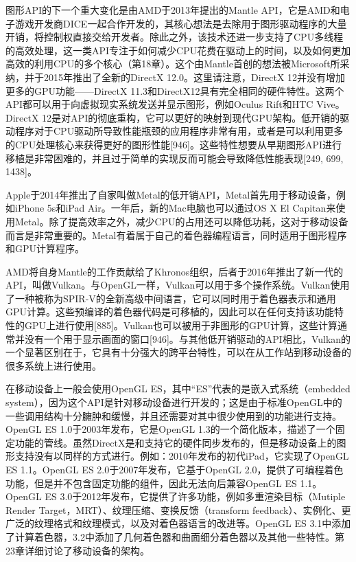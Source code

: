 \documentclass[
  paper=a4,
  ,captions=tableheading
]{scrartcl}
\begin{document}
图形API的下一个重大变化是由AMD于2013年提出的Mantle
API，它是AMD和电子游戏开发商DICE一起合作开发的，其核心想法是去除用于图形驱动程序的大量开销，将控制权直接交给开发者。除此之外，该技术还进一步支持了CPU多线程的高效处理，这一类API专注于如何减少CPU花费在驱动上的时间，以及如何更加高效的利用CPU的多个核心（第18章）。这个由Mantle首创的想法被Microsoft所采纳，并于2015年推出了全新的DirectX
12.0。这里请注意，DirectX 12并没有增加更多的GPU功能------DirectX
11.3和DirectX12具有完全相同的硬件特性。这两个API都可以用于向虚拟现实系统发送并显示图形，例如Oculus
Rift和HTC Vive。DirectX
12是对API的彻底重构，它可以更好的映射到现代GPU架构。低开销的驱动程序对于CPU驱动所导致性能瓶颈的应用程序非常有用，或者是可以利用更多的CPU处理核心来获得更好的图形性能{[}946{]}。这些特性想要从早期图形API进行移植是非常困难的，并且过于简单的实现反而可能会导致降低性能表现{[}249,
699, 1438{]}。

Apple于2014年推出了自家叫做Metal的低开销API，Metal首先用于移动设备，例如iPhone
5s和iPad Air。一年后，新的Mac电脑也可以通过OS X El
Capitan来使用Metal。除了提高效率之外，减少CPU的占用还可以降低功耗，这对于移动设备而言是非常重要的。Metal有着属于自己的着色器编程语言，同时适用于图形程序和GPU计算程序。

AMD将自身Mantle的工作贡献给了Khronos组织，后者于2016年推出了新一代的API，叫做Vulkan。与OpenGL一样，Vulkan可以用于多个操作系统。Vulkan使用了一种被称为SPIR-V的全新高级中间语言，它可以同时用于着色器表示和通用GPU计算。这些预编译的着色器代码是可移植的，因此可以在任何支持该功能特性的GPU上进行使用{[}885{]}。Vulkan也可以被用于非图形的GPU计算，这些计算通常并没有一个用于显示画面的窗口{[}946{]}。与其他低开销驱动的API相比，Vulkan的一个显著区别在于，它具有十分强大的跨平台特性，可以在从工作站到移动设备的很多系统上进行使用。

在移动设备上一般会使用OpenGL ES，其中``ES''代表的是嵌入式系统（embedded
system），因为这个API是针对移动设备进行开发的；这是由于标准OpenGL中的一些调用结构十分臃肿和缓慢，并且还需要对其中很少使用到的功能进行支持。OpenGL
ES 1.0于2003年发布，它是OpenGL
1.3的一个简化版本，描述了一个固定功能的管线。虽然DirectX是和支持它的硬件同步发布的，但是移动设备上的图形支持没有以同样的方式进行。例如：2010年发布的初代iPad，它实现了OpenGL
ES 1.1。OpenGL ES 2.0于2007年发布，它基于OpenGL
2.0，提供了可编程着色功能，但是并不包含固定功能的组件，因此无法向后兼容OpenGL
ES 1.1。OpenGL ES
3.0于2012年发布，它提供了许多功能，例如多重渲染目标（Mutiple Render
Target，MRT）、纹理压缩、变换反馈（transform
feedback）、实例化、更广泛的纹理格式和纹理模式，以及对着色器语言的改进等。OpenGL
ES
3.1中添加了计算着色器，3.2中添加了几何着色器和曲面细分着色器以及其他一些特性。第23章详细讨论了移动设备的架构。
\end{document}

